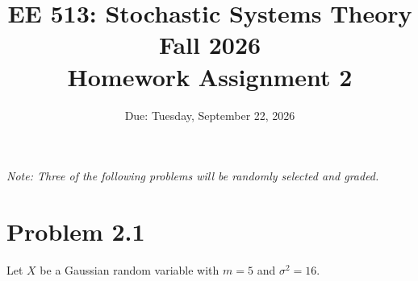 \documentclass[11pt]{article}
\title{EE 513: Stochastic Systems Theory \\ Fall 2026 \\ Homework Assignment 2}
\author{\theauthorname}
\date{Due: Tuesday, September 22, 2026}
\begin{document}
\maketitle

\noindent \textit{Note: Three of the following problems will be randomly selected and graded.}
\newenvironment{solution}{\par\noindent\textbf{Solution.}\ }{\par\vspace{6pt}}

\vspace{1em}

\section*{Problem 2.1}
Let $X$ be a Gaussian random variable with $m = 5$ and $\sigma^2 = 16$.
\end{document}
